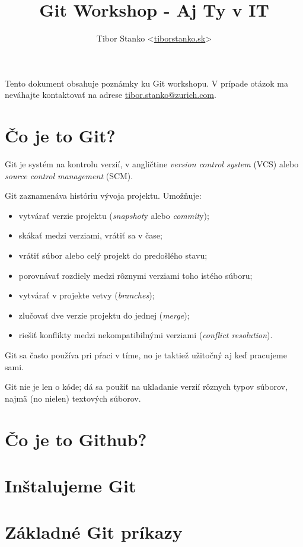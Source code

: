 \documentclass[a4paper,12pt,oneside]{article}
\title{Git Workshop - Aj Ty v IT}
\author{Tibor Stanko <\url{tiborstanko.sk}>}
\begin{document}
\maketitle

Tento dokument obsahuje poznámky ku Git workshopu. V prípade otázok ma neváhajte kontaktovať na adrese \url{tibor.stanko@zurich.com}.

\tableofcontents

\section{Čo je to Git?}

Git je systém na kontrolu verzií, v angličtine \textit{version control system} (VCS) alebo \textit{source control management} (SCM).

Git zaznamenáva históriu vývoja projektu. Umožňuje:
\begin{itemize}
      \item vytvárať verzie projektu (\textit{snapshot}y alebo \textit{commit}y);
      \item skákať medzi verziami, vrátiť sa v čase;
      \item vrátiť súbor alebo celý projekt do predošlého stavu;
      \item porovnávať rozdiely medzi rôznymi verziami toho istého súboru;
      \item vytvárať v projekte vetvy (\textit{branches});
      \item zlučovať dve verzie projektu do jednej (\textit{merge});
      \item riešiť konflikty medzi nekompatibilnými verziami (\textit{conflict resolution}).
\end{itemize}

Git sa často používa pri pŕaci v tíme, no je taktiež užitočný aj keď pracujeme sami.

Git nie je len o kóde; dá sa použiť na ukladanie verzií rôznych typov súborov, najmä (no nielen) textových súborov.

\section{Čo je to Github?}

\section{Inštalujeme Git}

\section{Základné Git príkazy}
\end{document}
